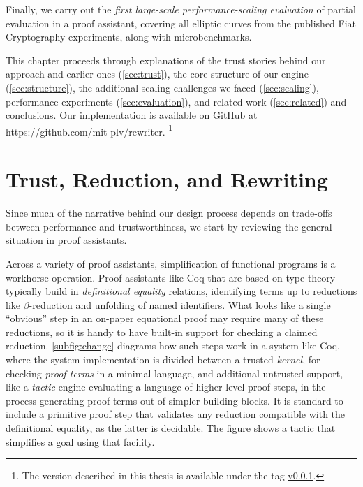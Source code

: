 Finally, we carry out the \emph{first large-scale performance-scaling evaluation} of partial evaluation in a proof assistant, covering all elliptic curves from the published Fiat Cryptography experiments, along with microbenchmarks.

This chapter proceeds through explanations of the trust stories behind our approach and earlier ones (\autoref{sec:trust}), the core structure of our engine (\autoref{sec:structure}), the additional scaling challenges we faced (\autoref{sec:scaling}), performance experiments (\autoref{sec:evaluation}), and related work (\autoref{sec:related}) and conclusions.
Our implementation is available on GitHub at \url{https://github.com/mit-plv/rewriter}.%
\footnote{%
  The version described in this thesis is available under the tag \href{https://github.com/mit-plv/rewriter/tree/v0.0.1}{v0.0.1}.
}


\section{Trust, Reduction, and Rewriting}\label{sec:trust}

Since much of the narrative behind our design process depends on trade-offs between performance and trustworthiness, we start by reviewing the general situation in proof assistants.

Across a variety of proof assistants, simplification of functional programs is a workhorse operation.
Proof assistants like Coq that are based on type theory typically build in \emph{definitional equality} relations, identifying terms up to reductions like $\beta$-reduction and unfolding of named identifiers.
What looks like a single ``obvious'' step in an on-paper equational proof may require many of these reductions, so it is handy to have built-in support for checking a claimed reduction.
\autoref{subfig:change} diagrams how such steps work in a system like Coq, where the system implementation is divided between a trusted \emph{kernel}, for checking \emph{proof terms} in a minimal language, and additional untrusted support, like a \emph{tactic} engine evaluating a language of higher-level proof steps, in the process generating proof terms out of simpler building blocks.
It is standard to include a primitive proof step that validates any reduction compatible with the definitional equality, as the latter is decidable.
The figure shows a tactic that simplifies a goal using that facility.

